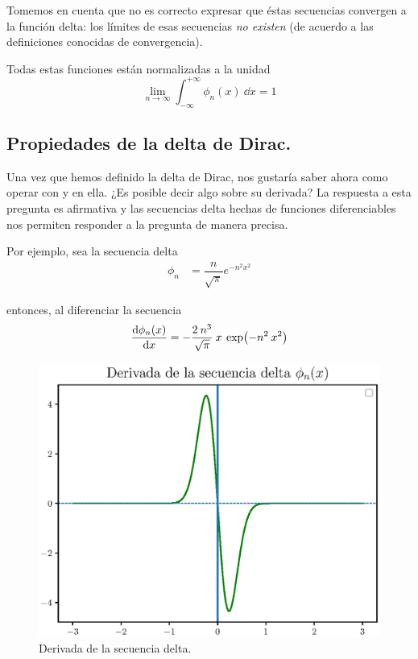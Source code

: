 Tomemos en cuenta que no es correcto expresar que éstas secuencias convergen a la función delta: los límites de esas secuencias \emph{no existen} (de acuerdo a las definiciones conocidas de convergencia).

Todas estas funciones están normalizadas a la unidad
\begin{equation}
\lim_{n \to \infty} \int_{- \infty}^{+ \infty} \phi_{n}(x) \: \dd{x} = 1
\label{eq:ecuacion_delta_05}
\end{equation}

\subsection{Propiedades de la delta de Dirac.}

Una vez que hemos definido la delta de Dirac, nos gustaría saber ahora como operar con y en ella. ¿Es posible decir algo sobre su derivada? La respuesta a esta pregunta es afirmativa y las secuencias delta hechas de funciones diferenciables nos permiten responder a la pregunta de manera precisa.
\par
Por ejemplo, sea la secuencia delta
\begin{align*}
\phi_{n} &= \dfrac{n}{\sqrt{\pi}} e^{-n^{2} x^{2}}
\end{align*}

entonces, al diferenciar la secuencia
\begin{align*}
\dv{\phi_{n}(x)}{x} = - \dfrac{2 \: n^{3}}{\sqrt{\pi}} \: x \: \exp(-n^{2} \: x^{2})
\end{align*}

\begin{figure}[H]
    \centering
    \includegraphics[scale=0.8]{Imagenes/secuencia_delta_04.eps}
    \caption{Derivada de la secuencia delta.}
    \label{fig:fig_figura_delta_04}
\end{figure}

